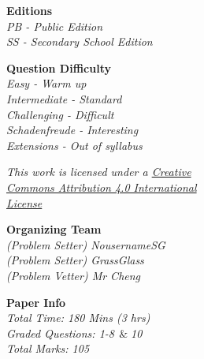 \begin{multicols*}{2}
      \textbf{\Large{Editions}} \\
      \textit{
          \hspace*{13.5pt} PB - Public Edition \\
          \hspace*{13.5pt} SS - Secondary School Edition \\
  }

      \textbf{\Large{Question Difficulty}} \\
      \textit{
            \hspace*{13.5pt} Easy - Warm up \\
            \hspace*{13.5pt} Intermediate - Standard \\
            \hspace*{13.5pt} Challenging - Difficult \\
            \hspace*{13.5pt} Schadenfreude - Interesting \\
            \hspace*{13.5pt} Extensions - Out of syllabus
  }

  \vspace*{40pt}

  \textit{This work is licensed under a \href{http://creativecommons.org/licenses/by/4.0/}{Creative \\ \hspace*{13.5pt} Commons Attribution 4.0 International \\ \hspace*{13.5pt} License}}

  \textbf{\Large{Organizing Team}} \\
  \textit{
        \hspace*{13pt} (Problem Setter) NousernameSG \\
        \hspace*{13pt} (Problem Setter) GrassGlass \\
        \hspace*{13pt} (Problem Vetter) Mr Cheng \\
  }

  \textbf{\Large{Paper Info}} \\
  \textit{
        \hspace*{13pt} Total Time: 180 Mins (3 hrs) \\
        \hspace*{13pt} Graded Questions: 1-8\(\;\,\&\;\)10 \\
        \hspace*{13pt} Total Marks: 105
  }
        \vspace*{15pt}


\end{multicols*}

